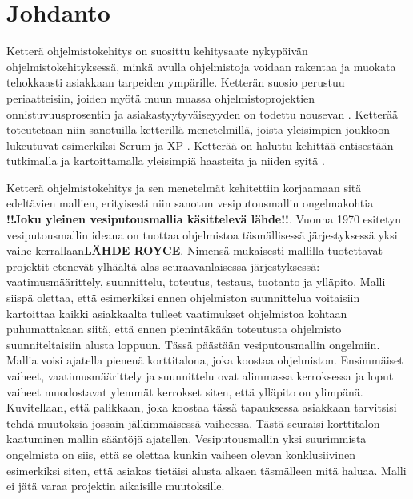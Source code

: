 \chapter{Johdanto\label{intro}}

Ketterä ohjelmistokehitys on suosittu kehitysaate nykypäivän ohjelmistokehityksessä, minkä avulla ohjelmistoja voidaan rakentaa ja muokata tehokkaasti asiakkaan tarpeiden ympärille. Ketterän suosio perustuu periaatteisiin, joiden myötä muun muassa ohjelmistoprojektien onnistuvuusprosentin ja asiakastyytyväiseyyden on todettu nousevan \cite{9533020}. Ketterää toteutetaan niin sanotuilla ketterillä menetelmillä, joista yleisimpien joukkoon lukeutuvat esimerkiksi Scrum \cite{SCRUMORG} ja XP \cite{XPORG}. Ketterää on haluttu kehittää entisestään tutkimalla ja kartoittamalla yleisimpiä haasteita ja niiden syitä \cite{7872736}.

Ketterä ohjelmistokehitys ja sen menetelmät kehitettiin korjaamaan sitä edeltävien mallien, erityisesti niin sanotun vesiputousmallin ongelmakohtia \textbf{!!Joku yleinen vesiputousmallia käsittelevä lähde!!}. Vuonna 1970 esitetyn vesiputousmallin ideana on tuottaa ohjelmistoa täsmällisessä järjestyksessä yksi vaihe kerrallaan\textbf{LÄHDE ROYCE}. Nimensä mukaisesti mallilla tuotettavat projektit etenevät ylhäältä alas seuraavanlaisessa järjestyksessä: vaatimusmäärittely, suunnittelu, toteutus, testaus, tuotanto ja ylläpito. Malli siispä olettaa, että esimerkiksi ennen ohjelmiston suunnittelua voitaisiin kartoittaa kaikki asiakkaalta tulleet vaatimukset ohjelmistoa kohtaan puhumattakaan siitä, että ennen pienintäkään toteutusta ohjelmisto suunniteltaisiin alusta loppuun. Tässä päästään vesiputousmallin ongelmiin. Mallia voisi ajatella pienenä korttitalona, joka koostaa ohjelmiston. Ensimmäiset vaiheet, vaatimusmäärittely ja suunnittelu ovat alimmassa kerroksessa ja loput vaiheet muodostavat ylemmät kerrokset siten, että ylläpito on ylimpänä. Kuvitellaan, että palikkaan, joka koostaa tässä tapauksessa asiakkaan tarvitsisi tehdä muutoksia jossain jälkimmäisessä vaiheessa. Tästä seuraisi korttitalon kaatuminen mallin sääntöjä ajatellen. Vesiputousmallin yksi suurimmista ongelmista on siis, että se olettaa kunkin vaiheen olevan konklusiivinen esimerkiksi siten, että asiakas tietäisi alusta alkaen täsmälleen mitä haluaa. Malli ei jätä varaa projektin aikaisille muutoksille.

